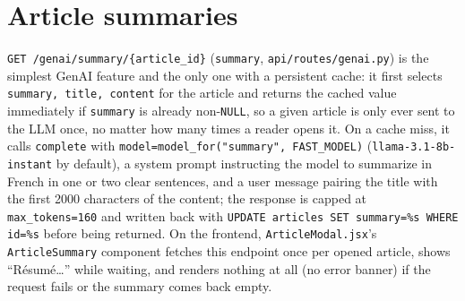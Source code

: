 \section{Article summaries}
\label{sec:genai-summaries}
\begin{sloppypar}
\texttt{GET /genai/\allowbreak summary/\{article\_id\}} (\texttt{summary}, \texttt{api/\allowbreak routes/\allowbreak genai.py}) is the simplest GenAI feature and the only one with a persistent cache: it first selects \texttt{summary, title, content} for the article and returns the cached value immediately if \texttt{summary} is already non-\texttt{NULL}, so a given article is only ever sent to the LLM once, no matter how many times a reader opens it. On a cache miss, it calls \texttt{complete} with \texttt{model=model\_\allowbreak for("summary", FAST\_MODEL)} (\texttt{llama-3.1-8b-instant} by default), a system prompt instructing the model to summarize in French in one or two clear sentences, and a user message pairing the title with the first 2000 characters of the content; the response is capped at \texttt{max\_tokens=160} and written back with \texttt{UPDATE articles SET summary=\%s WHERE id=\%s} before being returned. On the frontend, \texttt{ArticleModal.jsx}'s \texttt{ArticleSummary} component fetches this endpoint once per opened article, shows ``Résumé\ldots'' while waiting, and renders nothing at all (no error banner) if the request fails or the summary comes back empty.
\end{sloppypar}

